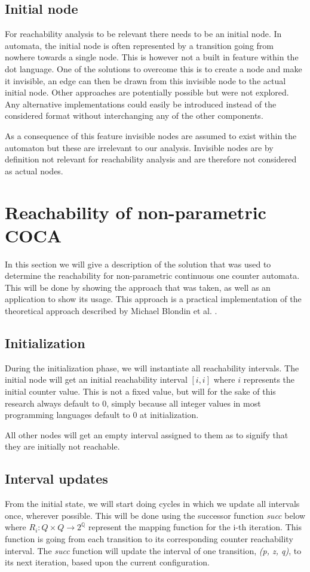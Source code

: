 \documentclass[12pt]{thesis}
\begin{document}
\subsection{Initial node}
For reachability analysis to be relevant there needs to be an initial node. In automata, the initial node is often represented by a transition going from nowhere towards a single node. This is however not a built in feature within the dot language. One of the solutions to overcome this is to create a node and make it invisible, an edge can then be drawn from this invisible node to the actual initial node. Other approaches are potentially possible but were not explored. Any alternative implementations could easily be introduced instead of the considered format without interchanging any of the other components.

As a consequence of this feature invisible nodes are assumed to exist within the automaton but these are irrelevant to our analysis. Invisible nodes are by definition not relevant for reachability analysis and are therefore not considered as actual nodes.

\section{Reachability of non-parametric COCA}
\label{sec:reachability non parametric}
In this section we will give a description of the solution that was used to determine the reachability for non-parametric continuous one counter automata. This will be done by showing the approach that was taken, as well as an application to show its usage. This approach is a practical implementation of the theoretical approach described by Michael Blondin et al. \cite{blondin2021continuous}.

\subsection{Initialization}
During the initialization phase, we will instantiate all reachability intervals. The initial node will get an initial reachability interval $[i, i]$ where $i$ represents the initial counter value. This is not a fixed value, but will for the sake of this research always default to 0, simply because all integer values in most programming languages default to 0 at initialization.

All other nodes will get an empty interval assigned to them as to signify that they are initially not reachable.

\subsection{Interval updates}
\label{interval updates}
From the initial state, we will start doing cycles in which we update all intervals once, wherever possible. This will be done using the successor function \textit{succ} below where $R_i: Q \times Q \rightarrow 2^\mathbb{Q}$ represent the mapping function for the i-th iteration. This function is going from each transition to its corresponding counter reachability interval. The \textit{succ} function will update the interval of one transition, \textit{(p, z, q)}, to its next iteration, based upon the current configuration.
\end{document}
